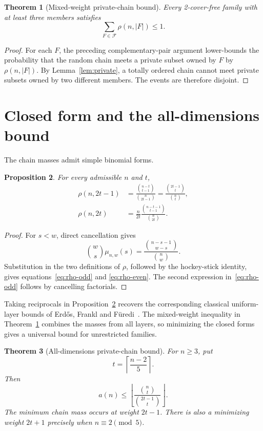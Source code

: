 \documentclass[11pt]{article}
\newtheorem{theorem}{Theorem}
\newtheorem{proposition}[theorem]{Proposition}
\newcommand{\F}{\mathcal F}
\begin{document}
\begin{theorem}[Mixed-weight private-chain bound]\label{thm:chain}
Every 2-cover-free family with at least three members satisfies
\[
 \sum_{F\in\F}\rho(n,|F|)\leq1.
\]
\end{theorem}

\begin{proof}
For each $F$, the preceding complementary-pair argument lower-bounds the
probability that the random chain meets a private subset owned by $F$ by
$\rho(n,|F|)$.  By Lemma~\ref{lem:private}, a totally ordered chain cannot
meet private subsets owned by two different members.  The events are
therefore disjoint.
\end{proof}

\section{Closed form and the all-dimensions bound}

The chain masses admit simple binomial forms.

\begin{proposition}\label{prop:closed-rho}
For every admissible $n$ and $t$,
\begin{align}
 \rho(n,2t-1)
 &=\frac{\binom{n-t}{t-1}}{\binom n{2t-1}}
  =\frac{\binom{2t-1}t}{\binom nt},
  \label{eq:rho-odd}\\
 \rho(n,2t)
 &=\frac n{2t}\frac{\binom{n-t-1}{t-1}}{\binom n{2t}}.
  \label{eq:rho-even}
\end{align}
\end{proposition}

\begin{proof}
For $s<w$, direct cancellation gives
\[
 \binom ws\mu_{n,w}(s)
 =\frac{\binom{n-s-1}{w-s}}{\binom nw}.
\]
Substitution in the two definitions of $\rho$, followed by the
hockey-stick identity, gives equations~\eqref{eq:rho-odd} and
\eqref{eq:rho-even}.  The second expression in~\eqref{eq:rho-odd} follows
by cancelling factorials.
\end{proof}

Taking reciprocals in Proposition~\ref{prop:closed-rho} recovers the
corresponding classical uniform-layer bounds of Erd\H{o}s, Frankl and
F\"uredi~\cite{eff1982}.  The mixed-weight inequality in
Theorem~\ref{thm:chain} combines the masses from all layers, so minimizing
the closed forms gives a universal bound for unrestricted families.

\begin{theorem}[All-dimensions private-chain bound]\label{thm:all-n}
For $n\geq3$, put
\[
 t=\left\lceil\frac{n-2}{5}\right\rceil.
\]
Then
\begin{equation}\label{eq:all-n-bound}
 a(n)\leq
 \left\lfloor\frac{\binom nt}{\binom{2t-1}t}\right\rfloor.
\end{equation}
The minimum chain mass occurs at weight $2t-1$.  There is also a minimizing
weight $2t+1$ precisely when $n\equiv2\pmod5$.
\end{theorem}
\end{document}
